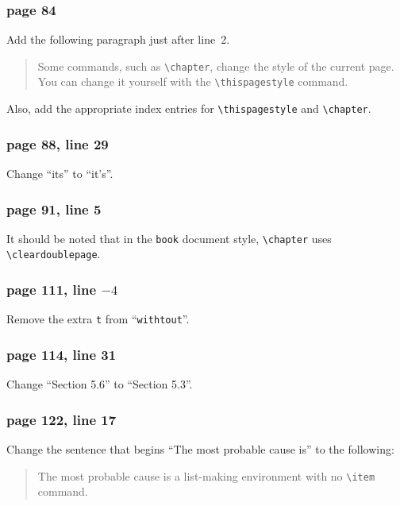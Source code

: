 \subsubsection*{page 84}
Add the following paragraph just after line~2.
\begin{quote}
Some commands, such as \verb|\chapter|, change the style of the current
page.  You can change it yourself with the \verb|\thispagestyle|
command.
\end{quote}
Also, add the appropriate index entries for \verb|\thispagestyle| and
\verb|\chapter|.

\subsubsection*{page 88, line 29}
Change ``its'' to ``it's''.

\subsubsection*{page 91, line 5}
\begin{sloppypar}
It should be noted that in the {\tt book} document style,
\verb|\chapter| uses \verb|\cleardoublepage|.
\end{sloppypar}

\subsubsection*{page 111, line $-4$}
Remove the extra {\tt t} from ``{\tt withtout}''.

\subsubsection*{page 114, line 31}
Change ``Section 5.6'' to ``Section 5.3''.


\subsubsection*{page 122, line 17}
Change the sentence that begins ``The most probable cause is'' to
the following:
\begin{quote}
The most probable cause is a list-making environment with no
\verb|\item| command.
\end{quote}


